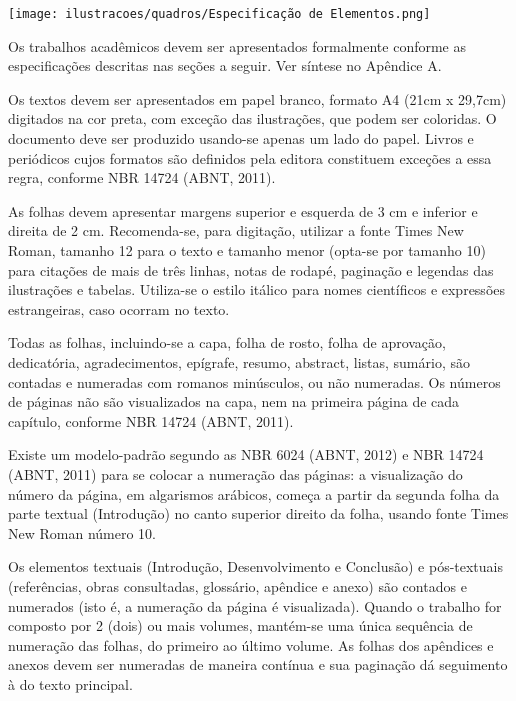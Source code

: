 \begin{Desenvolvimento}

\begin{quadro} [h!]
  \centering
  \addquadro
  \texttt{[image: ilustracoes/quadros/Especificação de Elementos.png]}
  \label{quadro:EspecificacaoElementos}
\end{quadro}

Os trabalhos acadêmicos devem ser apresentados formalmente conforme as especificações descritas nas seções a seguir. Ver síntese no Apêndice A.

Os textos devem ser apresentados em papel branco, formato A4 (21cm x 29,7cm) digitados na cor preta, com exceção das ilustrações, que podem ser coloridas. O documento deve ser produzido usando-se apenas um lado do papel. Livros e periódicos cujos formatos são definidos pela editora constituem exceções a essa regra, conforme NBR 14724 (ABNT, 2011).

As folhas devem apresentar margens superior e esquerda de 3 cm e inferior e direita de 2 cm. Recomenda-se, para digitação, utilizar a fonte Times New Roman, tamanho 12 para o texto e tamanho menor (opta-se por tamanho 10) para citações de mais de três linhas, notas de rodapé, paginação e legendas das ilustrações e tabelas. Utiliza-se o estilo itálico para nomes científicos e expressões estrangeiras, caso ocorram no texto.

Todas as folhas, incluindo-se a capa, folha de rosto, folha de aprovação, dedicatória, agradecimentos, epígrafe, resumo, abstract, listas, sumário, são contadas e numeradas com romanos minúsculos, ou não numeradas. Os números de páginas não são visualizados na capa, nem na primeira página de cada capítulo, conforme NBR 14724 (ABNT, 2011).

Existe um modelo-padrão segundo as NBR 6024 (ABNT, 2012) e NBR 14724 (ABNT, 2011) para se colocar a numeração das páginas: a visualização do número da página, em algarismos arábicos, começa a partir da segunda folha da parte textual (Introdução) no canto superior direito da folha, usando fonte Times New Roman número 10.

Os elementos textuais (Introdução, Desenvolvimento e Conclusão) e pós-textuais (referências, obras consultadas, glossário, apêndice e anexo) são contados e numerados (isto é, a numeração da página é visualizada). Quando o trabalho for composto por 2 (dois) ou mais volumes, mantém-se uma única sequência de numeração das folhas, do primeiro ao último volume. As folhas dos apêndices e anexos devem ser numeradas de maneira contínua e sua paginação dá seguimento à do texto principal.


\end{Desenvolvimento}
